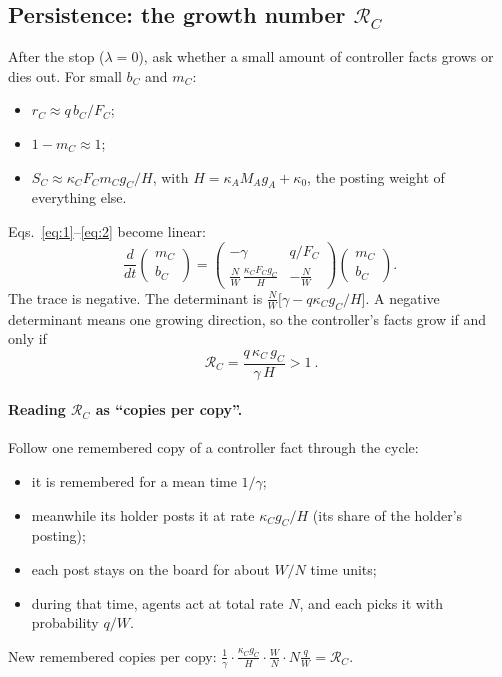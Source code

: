 \documentclass[10pt,a4paper]{article}
\begin{document}
\subsection{Persistence: the growth number $\mathcal R_C$}
\label{sec:RC}
After the stop ($\lambda=0$), ask whether a small amount of controller facts grows or dies out. For small $b_C$ and
$m_C$:
\begin{itemize}
\item $r_C\approx q\,b_C/F_C$;
\item $1-m_C\approx1$;
\item $S_C\approx\kappa_C F_C m_C g_C/H$, with $H=\kappa_A M_A g_A+\kappa_0$, the posting weight of everything else.
\end{itemize}
Eqs.~\eqref{eq:1}--\eqref{eq:2} become linear:
\begin{equation}
\frac{d}{dt}\begin{pmatrix}m_C\\ b_C\end{pmatrix}=
\begin{pmatrix}-\gamma & q/F_C\\ \frac NW\,\frac{\kappa_C F_C g_C}{H} & -\frac NW\end{pmatrix}
\begin{pmatrix}m_C\\ b_C\end{pmatrix}.
\end{equation}
The trace is negative. The determinant is $\frac NW\big[\gamma-q\kappa_C g_C/H\big]$. A negative determinant means one
growing direction, so the controller's facts grow if and only if
\begin{equation}
\boxed{\ \mathcal R_C=\frac{q\,\kappa_C\,g_C}{\gamma\,H}>1\ }.\label{eq:R}
\end{equation}

\paragraph{Reading $\mathcal R_C$ as ``copies per copy''.} Follow one remembered copy of a controller fact through the
cycle:
\begin{itemize}
\item it is remembered for a mean time $1/\gamma$;
\item meanwhile its holder posts it at rate $\kappa_C g_C/H$ (its share of the holder's posting);
\item each post stays on the board for about $W/N$ time units;
\item during that time, agents act at total rate $N$, and each picks it with probability $q/W$.
\end{itemize}
New remembered copies per copy: $\frac1\gamma\cdot\frac{\kappa_C g_C}{H}\cdot\frac WN\cdot N\frac qW=\mathcal R_C$.
\end{document}
